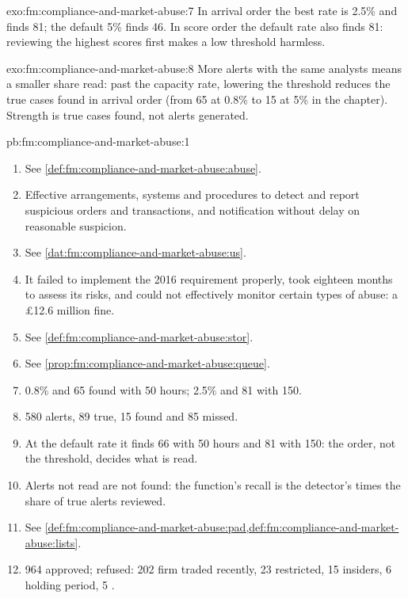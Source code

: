 \begin{solution}{exo:fm:compliance-and-market-abuse:7}
In arrival order the best rate is 2.5\% and finds 81; the default 5\% finds 46. In score order the default rate also finds 81: reviewing the
highest scores first makes a low threshold harmless.
\end{solution}

\begin{solution}{exo:fm:compliance-and-market-abuse:8}
More alerts with the same analysts means a smaller share read: past the capacity rate, lowering the threshold reduces the true cases found in
arrival order (from 65 at 0.8\% to 15 at 5\% in the chapter). Strength is true cases found, not alerts generated.
\end{solution}

\begin{solution}{pb:fm:compliance-and-market-abuse:1}
\begin{enumerate}
\item See \cref{def:fm:compliance-and-market-abuse:abuse}.
\item Effective arrangements, systems and procedures to detect and report suspicious orders and transactions, and notification without delay on
reasonable suspicion.
\item See \cref{dat:fm:compliance-and-market-abuse:us}.
\item It failed to implement the 2016 requirement properly, took eighteen months to assess its risks, and could not effectively monitor certain
types of abuse: a \pounds12.6 million fine.
\item See \cref{def:fm:compliance-and-market-abuse:stor}.
\item See \cref{prop:fm:compliance-and-market-abuse:queue}.
\item 0.8\% and 65 found with 50 hours; 2.5\% and 81 with 150.
\item 580 alerts, 89 true, 15 found and 85 missed.
\item At the default rate it finds 66 with 50 hours and 81 with 150: the order, not the threshold, decides what is read.
\item Alerts not read are not found: the function's recall is the detector's times the share of true alerts reviewed.
\item See \cref{def:fm:compliance-and-market-abuse:pad,def:fm:compliance-and-market-abuse:lists}.
\item 964 approved; refused: 202 firm traded recently, 23 restricted, 15 insiders, 6 holding period, 5 .

\end{enumerate}
\end{solution}
